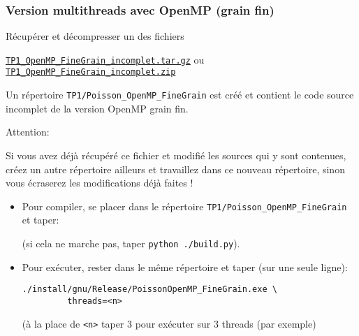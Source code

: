 \documentclass{beamer}
\begin{document}
\begin{frame}[fragile]
	\frametitle{Version multithreads avec OpenMP (grain fin)}
	
Récupérer et décompresser un des fichiers \bigskip

\href{https://perso.ensta-paris.fr/~tajchman/Seance3/TP1_OpenMP_FineGrain_incomplet.tar.gz}{\tt TP1\_OpenMP\_FineGrain\_incomplet.tar.gz} ou \href{https://perso.ensta-paris.fr/~tajchman/Seance3/TP1_OpenMP_FineGrain_incomplet.zip}{\tt TP1\_OpenMP\_FineGrain\_incomplet.zip}
\bigskip

Un répertoire {\tt TP1/Poisson\_OpenMP\_FineGrain} est créé et contient le code source incomplet de la version OpenMP grain fin.
 
\vfill
{\color{red}
	Attention:
	\bigskip
	
	\begin{minipage}{\textwidth}\color{red}
Si vous avez déjà récupéré ce fichier et modifié les sources qui y sont contenues, créez un autre répertoire ailleurs et travaillez dans ce nouveau répertoire, sinon vous écraserez les modifications déjà faites !
	\end{minipage}
}
\vfill
\end{frame}

\begin{frame}[fragile]

\begin{itemize}
	\item 	Pour compiler, se placer dans le répertoire {\tt TP1/Poisson\_OpenMP\_FineGrain} et taper:
	
	
	\vfill
	(si cela ne marche pas, taper \verb|python ./build.py|).
	
	\vfill
	\item Pour exécuter, rester dans le même répertoire et taper (sur une seule ligne):
	
	\hspace{2cm}
	{\color{blue}\begin{verbatim}
./install/gnu/Release/PoissonOpenMP_FineGrain.exe \
		 threads=<n>
\end{verbatim}
	}
	
	\vfill
	(à la place de {\tt <n>} taper 3 pour exécuter sur 3 threads (par exemple)
	\vfill
	
\end{itemize}
\end{frame}
\end{document}
